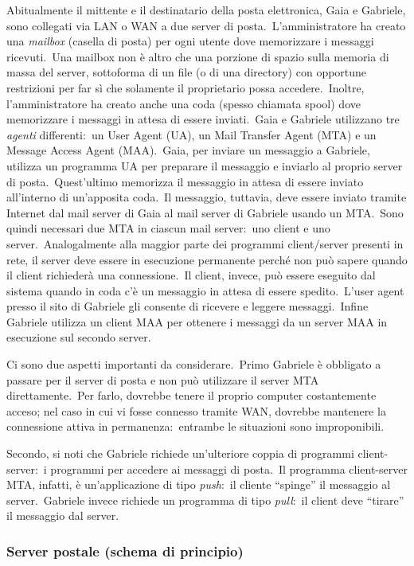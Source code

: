 Abitualmente il mittente e il destinatario della posta elettronica, Gaia e Gabriele, sono collegati via LAN o WAN a due server di posta.\
L'amministratore ha creato una \emph{mailbox} (casella di posta) per ogni utente dove memorizzare i messaggi ricevuti.\
Una mailbox non è altro che una porzione di spazio sulla memoria di massa del server, sottoforma di un file (o di una directory) con opportune restrizioni per far sì che solamente il proprietario possa accedere.\
Inoltre, l'amministratore ha creato anche una coda (spesso chiamata spool) dove memorizzare i messaggi in attesa di essere inviati.\
Gaia e Gabriele utilizzano tre \emph{agenti} differenti:\ un User Agent (UA), un Mail Transfer Agent (MTA) e un Message Access Agent (MAA).\
Gaia, per inviare un messaggio a Gabriele, utilizza un programma UA per preparare il messaggio e inviarlo al proprio server di posta.\
Quest'ultimo memorizza il messaggio in attesa di essere inviato all'interno di un'apposita coda.\
Il messaggio, tuttavia, deve essere inviato tramite Internet dal mail server di Gaia al mail server di Gabriele usando un MTA.\
Sono quindi necessari due MTA in ciascun mail server:\ uno client e uno server.\
Analogalmente alla maggior parte dei programmi client/server presenti in rete, il server deve essere in esecuzione permanente perché non può sapere quando il client richiederà una connessione.\
Il client, invece, può essere eseguito dal sistema quando in coda c'è un messaggio in attesa di essere spedito.\
L'user agent presso il sito di Gabriele gli consente di ricevere e leggere messaggi.\
Infine Gabriele utilizza un client MAA per ottenere i messaggi da un server MAA in esecuzione sul secondo server.

Ci sono due aspetti importanti da considerare.\
Primo Gabriele è obbligato a passare per il server di posta e non può utilizzare il server MTA direttamente.\
Per farlo, dovrebbe tenere il proprio computer costantemente acceso; nel caso in cui vi fosse connesso tramite WAN, dovrebbe mantenere la connessione attiva in permanenza:\ entrambe le situazioni sono improponibili.

Secondo, si noti che Gabriele richiede un'ulteriore coppia di programmi client-server:\ i programmi per accedere ai messaggi di posta.\
Il programma client-server MTA, infatti, è un'applicazione di tipo \emph{push}:\ il cliente ``spinge'' il messaggio al server.\
Gabriele invece richiede un programma di tipo \emph{pull}:\ il client deve ``tirare'' il messaggio dal server.

\subsubsection{Server postale (schema di principio)}

